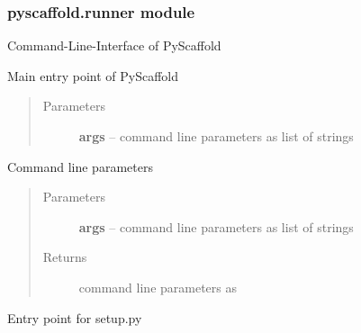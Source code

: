 \documentclass[letterpaper,10pt,english]{sphinxmanual}
\begin{document}
\subsubsection{pyscaffold.runner module}
\label{_rst/pyscaffold:module-pyscaffold.runner}\label{_rst/pyscaffold:pyscaffold-runner-module}
Command-Line-Interface of PyScaffold

\begin{fulllineitems}
\label{_rst/pyscaffold:pyscaffold.runner.main}
Main entry point of PyScaffold
\begin{quote}\begin{description}
\item[{Parameters}] \leavevmode
\textbf{args} -- command line parameters as list of strings

\end{description}\end{quote}

\end{fulllineitems}


\begin{fulllineitems}
\label{_rst/pyscaffold:pyscaffold.runner.parse_args}
Command line parameters
\begin{quote}\begin{description}
\item[{Parameters}] \leavevmode
\textbf{args} -- command line parameters as list of strings

\item[{Returns}] \leavevmode
command line parameters as \href{http://docs.python.org/2.7/library/argparse.html\#argparse.Namespace}{}

\end{description}\end{quote}

\end{fulllineitems}


\begin{fulllineitems}
\label{_rst/pyscaffold:pyscaffold.runner.run}
Entry point for setup.py

\end{fulllineitems}
\end{document}
